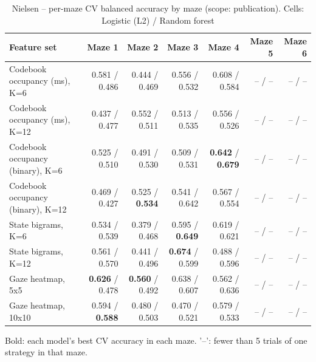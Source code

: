 \begin{table}[t]
\centering
\caption{Nielsen -- per-maze CV balanced accuracy by maze (scope: publication). Cells: Logistic (L2) / Random forest}
\label{tab:permaze_by_maze_Nielsen}
\begin{tabular}{lrrrrrr}
\toprule
Feature set & Maze 1 & Maze 2 & Maze 3 & Maze 4 & Maze 5 & Maze 6 \\
\midrule
Codebook occupancy (ms), K=6 & 0.581 / 0.486 & 0.444 / 0.469 & 0.556 / 0.532 & 0.608 / 0.584 & -- / -- & -- / -- \\
Codebook occupancy (ms), K=12 & 0.437 / 0.477 & 0.552 / 0.511 & 0.513 / 0.535 & 0.556 / 0.526 & -- / -- & -- / -- \\
Codebook occupancy (binary), K=6 & 0.525 / 0.510 & 0.491 / 0.530 & 0.509 / 0.531 & \textbf{0.642} / \textbf{0.679} & -- / -- & -- / -- \\
Codebook occupancy (binary), K=12 & 0.469 / 0.427 & 0.525 / \textbf{0.534} & 0.541 / 0.642 & 0.567 / 0.554 & -- / -- & -- / -- \\
State bigrams, K=6 & 0.534 / 0.539 & 0.379 / 0.468 & 0.595 / \textbf{0.649} & 0.619 / 0.621 & -- / -- & -- / -- \\
State bigrams, K=12 & 0.561 / 0.570 & 0.441 / 0.496 & \textbf{0.674} / 0.599 & 0.488 / 0.596 & -- / -- & -- / -- \\
Gaze heatmap, 5x5 & \textbf{0.626} / 0.478 & \textbf{0.560} / 0.492 & 0.638 / 0.607 & 0.562 / 0.636 & -- / -- & -- / -- \\
Gaze heatmap, 10x10 & 0.594 / \textbf{0.588} & 0.480 / 0.503 & 0.470 / 0.521 & 0.579 / 0.533 & -- / -- & -- / -- \\
\bottomrule
\end{tabular}
\par\smallskip
{\footnotesize Bold: each model's best CV accuracy in each maze. '--': fewer than 5 trials of one strategy in that maze.}
\end{table}
